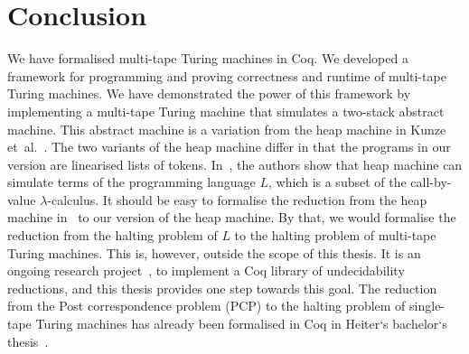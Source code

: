 \chapter{Conclusion}
\label{chap:conclusion}

We have formalised multi-tape Turing machines in Coq.  We developed a framework for programming and proving correctness and runtime of multi-tape
Turing machines.  We have demonstrated the power of this framework by implementing a multi-tape Turing machine that simulates a two-stack abstract
machine.  This abstract machine is a variation from the heap machine in Kunze et~al.~\cite{KunzeEtAl:2018:Formal}.  The two variants of the heap
machine differ in that the programs in our version are linearised lists of tokens.  In~\cite{KunzeEtAl:2018:Formal}, the authors show that heap
machine can simulate terms of the programming language $L$, which is a subset of the call-by-value $\lambda$-calculus.  It should be easy to formalise
the reduction from the heap machine in~\cite{KunzeEtAl:2018:Formal} to our version of the heap machine.  By that, we would formalise the reduction
from the halting problem of $L$ to the halting problem of multi-tape Turing machines.  This is, however, outside the scope of this thesis.  It is an
ongoing research project~\cite{ForsterLOLA}, to implement a Coq library of undecidability reductions, and this thesis provides one step towards this
goal.  The reduction from the Post correspondence problem (PCP) to the halting problem of single-tape Turing machines has already been formalised in
Coq in Heiter`s bachelor`s thesis~\cite{Heiter}.



